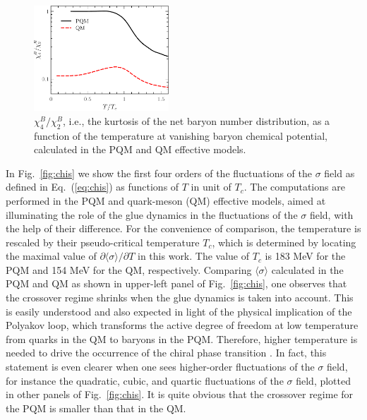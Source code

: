 \documentclass[final,5p,times,twocolumn,colorlinks=true,citecolor=blue,linkcolor=blue]{elsarticle}
\def\Fig#1{Fig.~\ref{#1}} \def\Tab#1{Tab.~\ref{#1}}
\def\Eq#1{Eq.~(\ref{#1})}
\begin{document}
%
\begin{figure}[t]
\includegraphics[width=0.45\textwidth]{R42B}
\caption{$\chi_4^{B}/\chi_2^{B}$, i.e., the kurtosis of the net baryon number distribution, as a function of the temperature at vanishing baryon chemical potential, calculated in the PQM and QM effective models.}\label{fig:R42B}
\end{figure}
%

In \Fig{fig:chis} we show the first four orders of the fluctuations of the $\sigma$ field as defined in \Eq{eq:chis} as functions of $T$ in unit of $T_c$. The computations are performed in the PQM and quark-meson (QM) effective models, aimed at illuminating the role of the glue dynamics in the fluctuations of the $\sigma$ field, with the help of their difference. For the convenience of comparison, the temperature is rescaled by their pseudo-critical temperature $T_c$, which is determined by locating the maximal value of $\partial \langle \sigma \rangle/\partial T$ in this work. The value of $T_c$ is 183 MeV for the PQM and 154 MeV for the QM, respectively. Comparing $\langle \sigma \rangle$ calculated in the PQM and QM as shown in upper-left panel of \Fig{fig:chis}, one observes that the crossover regime shrinks when the glue dynamics is taken into account. This is easily understood and also expected in light of the physical implication of the Polyakov loop, which transforms the active degree of freedom at low temperature from quarks in the QM to baryons in the PQM. Therefore, higher temperature is needed to drive the occurrence of the chiral phase transition \cite{Fu:2007xc,Fu:2015naa}. In fact, this statement is even clearer when one sees higher-order fluctuations of the $\sigma$ field, for instance the quadratic, cubic, and quartic fluctuations of the $\sigma$ field, plotted in other panels of \Fig{fig:chis}. It is quite obvious that the crossover regime for the PQM is smaller than that in the QM. 
\end{document}

